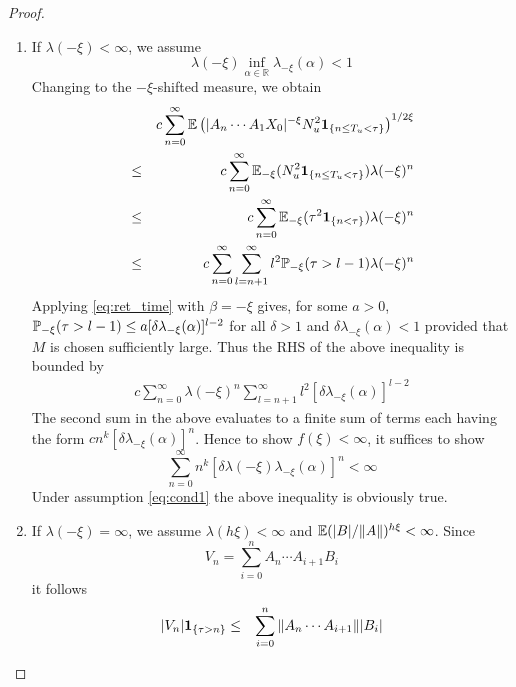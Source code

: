 \documentclass[aoas,preprint]{imsart}
\numberwithin{equation}{section}
\theoremstyle{plain}
\begin{document}
\begin{proof}
  \begin{enumerate}
  \item If $\lambda(-\xi) < \infty$, we assume
    \begin{equation}
      \label{eq:cond1}
      \lambda(-\xi)
      \inf_{\alpha \in \mathbb R} \lambda_{-\xi}(\alpha) < 1
    \end{equation}
    Changing to the $-\xi$-shifted measure, we obtain
    \begin{eqnarray}
      &&
      c \sum_{n=0}^\infty
      \E \left(
        |A_n \cdots A_1 X_0|^{-\xi}
        N_u^2
        \1{n \leq T_u < \tau}        
      \right)^{1/2\xi} \\
      &\leq&
      c \sum_{n=0}^\infty
      \E_{-\xi} (N_u^2 \1{n \leq T_u < \tau})
      \lambda(-\xi)^n \\
      &\leq&
      c \sum_{n=0}^\infty
      \E_{-\xi} (\tau^2 \1{n < \tau})
      \lambda(-\xi)^n \\
      &\leq&
      c \sum_{n=0}^\infty
      \sum_{l=n+1}^\infty
      l^2 \P_{-\xi}(\tau > l-1)
      \lambda(-\xi)^n
    \end{eqnarray}
    Applying \eqref{eq:ret_time} with $\beta = -\xi$ gives, for some
    $a > 0$, $\P_{-\xi}(\tau > l-1) \leq a [\delta \lambda_{-\xi}(\alpha)]^{l-2}$
    for all $\delta > 1$ and $\delta \lambda_{-\xi}(\alpha) < 1$
    provided that $M$ is chosen sufficiently large. Thus the RHS of the
    above inequality is bounded by
    \begin{eqnarray*}
      c \sum_{n=0}^\infty
      \lambda(-\xi)^n
      \sum_{l=n+1}^\infty
      l^2 [\delta \lambda_{-\xi}(\alpha)]^{l-2}
    \end{eqnarray*}
    The second sum in the above evaluates to a finite sum of terms
    each having the form $c n^k [\delta
    \lambda_{-\xi}(\alpha)]^n$. Hence to show $f(\xi) < \infty$, it
    suffices to show
    \begin{equation*}
      \sum_{n=0}^\infty
      n^k [\delta \lambda(-\xi) \lambda_{-\xi}(\alpha)]^n < \infty
    \end{equation*}
    Under assumption \eqref{eq:cond1} the above inequality is
    obviously true.
  \item If $\lambda(-\xi) = \infty$, we assume $\lambda(h\xi) <
    \infty$ and $\E(|B|/\|A\|)^{h\xi} <  \infty$. Since
    \[
    V_n = \sum_{i=0}^n A_n \cdots A_{i+1} B_i
    \]
    it follows
    \begin{eqnarray*}
      |V_n|\1{\tau > n} &\leq&
      \sum_{i=0}^{n} \|A_n \cdots A_{i+1}\| |B_i| \\

\end{eqnarray*}
\end{enumerate}
\end{proof}
\end{document}
